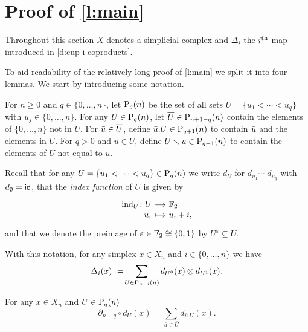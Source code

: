 
\section{Proof of \texorpdfstring{\cref{l:main}}{main lemma}} \label{s:proof}

Throughout this section $X$ denotes a simplicial complex and $\Delta_i$ the $i^\th$ map introduced in \cref{d:cup-i coproducts}.

To aid readability of the relatively long proof of \cref{l:main} we split it into four lemmas.
We start by introducing some notation.

\begin{definition}
	For $n \geq0$ and $q \in \{0, \dots, n\}$, let $\P_q(n)$ be the set of all sets $U = \{u_1 < \cdots < u_q\}$ with $u_j \in \{0, \dots, n\}$.
	For any $U \in \P_q(n)$, let $\overline{U} \in \P_{n+1-q}(n)$ contain the elements of $\{0, \dots, n\}$ not in $U$. For $\bu \in \overline{U}$, define $\bu.U \in \P_{q+1}(n)$ to contain $\bu$ and the elements in $U$.
	For $q > 0$ and $u \in U$, define $U \sm u \in \P_{q-1}(n)$ to contain the elements of $U$ not equal to $u$.
\end{definition}

Recall that for any $U = \{u_1 < \cdots < u_q\} \in \P_q(n)$ we write $d_U$ for $d_{u_1} \cdots \; d_{u_q}$ with $d_{\emptyset} = \id$, that
the \textit{index function} of $U$ is given by
\begin{equation*}
\begin{tikzcd}[row sep=-3pt, column sep=small,
/tikz/column 1/.append style={anchor=base east},
/tikz/column 2/.append style={anchor=base west}]
\ind_U \colon U \arrow[r] & \Ftwo \\
u_i \arrow[r, mapsto] & u_i + i,
\end{tikzcd}
\end{equation*}
and that we denote the preimage of $\varepsilon \in \Ftwo \cong \{0, 1\}$ by $U^\varepsilon \subseteq U$.

With this notation, for any simplex $x \in X_n$ and $i \in \{0, \dots, n\}$ we have
\begin{equation*}
\Delta_{i}(x)\ =\! \sum_{U \in \P_{n-i}(n)} d_{U^0}(x) \otimes d_{U^1}(x).
\end{equation*}

\begin{lemma} \label{l:partial dU = dxU}
	For any $x \in X_n$ and $U \in \P_{q}(n)$
	\begin{equation} \label{lemma1: existence:eq1}
	\partial_{n-q} \circ d_U(x) = \sum_{\bar{u} \in \overline{U}} d_{\bar{u}.U}(x).
	\end{equation}
\end{lemma}

